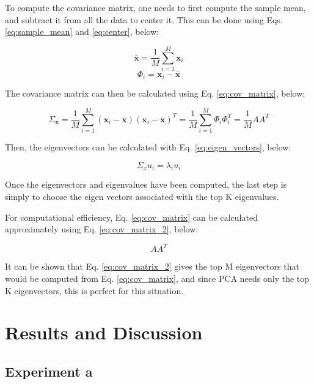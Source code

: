\documentclass{article}
\begin{document}
To compute the covariance matrix, one needs to first compute the sample mean, and subtract it from all the data
to center it. This can be done using Eqs. \ref{eq:sample_mean} and \ref{eq:center}, below:

\begin{equation}\label{eq:sample_mean}
    \bar{\mathbf{x}} = \frac{1}{M} \sum_{i=1}^{M} \mathbf{x}_i
\end{equation}
\begin{equation}\label{eq:center}
    \Phi_i = \mathbf{x}_i - \bar{\mathbf{x}}
\end{equation}

The covariance matrix can then be calculated using Eq. \ref{eq:cov_matrix}, below:

\begin{equation}\label{eq:cov_matrix}
    \Sigma_{\mathbf{x}} = \frac{1}{M} \sum_{i=1}^{M} (\mathbf{x}_i - \bar{\mathbf{x}})(\mathbf{x}_i - \bar{\mathbf{x}})^T = \frac{1}{M} \sum_{i=1}^{M} \Phi_i \Phi_i^T = \frac{1}{M} A A^T
\end{equation}

Then, the eigenvectors can be calculated with Eq. \ref{eq:eigen_vectors}, below:

\begin{equation}\label{eq:eigen_vectors}
    \Sigma_x u_i = \lambda_i u_i
\end{equation}

Once the eigenvectors and eigenvalues have been computed, the last step is simply to choose the eigen vectors
associated with the top K eigenvalues. 

For computational efficiency, Eq. \ref{eq:cov_matrix} can be calculated approximately using Eq. \ref{eq:cov_matrix_2}, below: 

\begin{equation}\label{eq:cov_matrix_2}
    A A^T
\end{equation}

It can be shown that Eq. \ref{eq:cov_matrix_2} gives the top M eigenvectors that would be computed from Eq. \ref{eq:cov_matrix}, 
and since PCA needs only the top K eigenvectors, this is perfect for this situation. 

\section{Results and Discussion}\label{results-and-discussion}

\subsection{Experiment a}\label{experiment-a-a}
\end{document}

